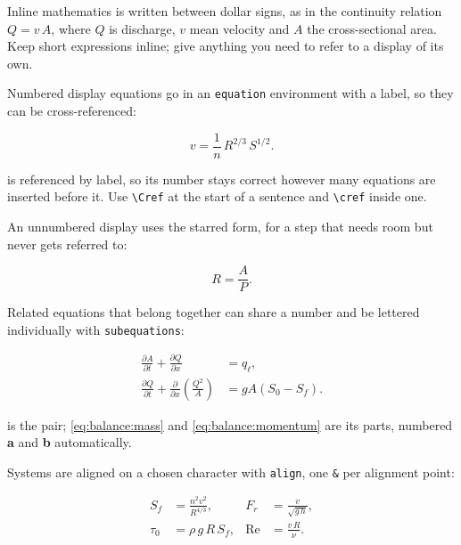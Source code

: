 Inline mathematics is written between dollar signs, as in the
continuity relation $Q = v\,A$, where $Q$ is discharge, $v$ mean
velocity and $A$ the cross-sectional area. Keep short expressions
inline; give anything you need to refer to a display of its own.

Numbered display equations go in an \texttt{equation} environment
with a label, so they can be cross-referenced:

\begin{equation}
    \label{eq:manning}
    v = \frac{1}{n}\,R^{2/3}\,S^{1/2}.
\end{equation}

 is referenced by label, so its number stays
correct however many equations are inserted before it. Use
\verb|\Cref| at the start of a sentence and \verb|\cref| inside
one.

An unnumbered display uses the starred form, for a step that
needs room but never gets referred to:

\begin{equation*}
    R = \frac{A}{P}.
\end{equation*}

Related equations that belong together can share a number and be
lettered individually with \texttt{subequations}:

\begin{subequations}
    \label{eq:balance}
    \begin{align}
        \frac{\partial A}{\partial t} + \frac{\partial Q}{\partial x} &= q_{\ell}, \label{eq:balance:mass} \\
        \frac{\partial Q}{\partial t} + \frac{\partial}{\partial x}\!\left(\frac{Q^{2}}{A}\right) &= gA\left(S_{0} - S_{f}\right). \label{eq:balance:momentum}
    \end{align}
\end{subequations}

 is the pair; \cref{eq:balance:mass} and
\cref{eq:balance:momentum} are its parts, numbered \textbf{a} and
\textbf{b} automatically.

Systems are aligned on a chosen character with \texttt{align},
one \verb|&| per alignment point:

\begin{align}
    \label{eq:system}
    S_{f}   &= \frac{n^{2} v^{2}}{R^{4/3}}, &
    F_{r}   &= \frac{v}{\sqrt{g\,h}}, \\
    \tau_0  &= \rho\,g\,R\,S_{f},           &
    \mathrm{Re} &= \frac{v\,R}{\nu}. \nonumber
\end{align}

